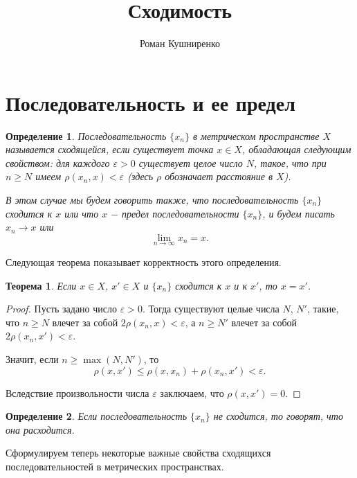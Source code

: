 \documentclass{article}
\title{Сходимость}
\author{Роман Кушниренко}
\newtheorem{theorem}{Теорема}[section]
\newtheorem{definition}{Определение}[section]
\begin{document}

	\maketitle

	\section{Последовательность и ее предел}

\begin{definition}
Последовательность \(\{x_n\}\) в метрическом пространстве \(X\) называется сходящейся, если существует точка \(x \in X\), обладающая следующим свойством: для каждого \(\varepsilon > 0\) существует целое число \(N\), такое, что при \(n \geq N\) имеем \(\rho(x_n, x) < \varepsilon\) (здесь \(\rho\) обозначает расстояние в \(X\)).

В этом случае мы будем говорить также, что последовательность \(\{x_n\}\) сходится к \(x\) или что \(x\) \(-\) предел последовательности \(\{x_n\}\), и будем писать \(x_n \to x\) или
\[
\lim_{n \to \infty} x_n = x.
\]
\end{definition}

Следующая теорема показывает корректность этого определения.

\begin{theorem}
Если \(x \in X\), \(x' \in X\) и \(\{x_n\}\) сходится к \(x\) и к \(x'\), то \(x = x'\).
\end{theorem}

\begin{proof}
Пусть задано число \(\varepsilon > 0\). Тогда существуют целые числа \(N\), \(N'\), такие, что \(n \geq N\) влечет за собой \(2\rho(x_n, x) < \varepsilon\), а \(n \geq N'\) влечет за собой \(2\rho(x_n, x') < \varepsilon\).

Значит, если \(n \geq \max(N, N')\), то
\[
\rho(x, x') \leq \rho(x, x_n) + \rho(x_n, x') < \varepsilon.
\]

Вследствие произвольности числа \(\varepsilon\) заключаем, что \(\rho(x, x') = 0\).
\end{proof}

\begin{definition}
Если последовательность \(\{x_n\}\) не сходится, то говорят, что она расходится.
\end{definition}

Сформулируем теперь некоторые важные свойства сходящихся последовательностей в метрических пространствах.
\end{document}
